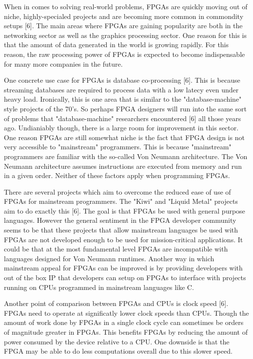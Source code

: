 \documentclass{article}
\begin{document}
    When in comes to solving real-world problems, FPGAs are quickly moving out of niche,
    highly-specialed projects and are becoming more common in commondity setups [6].
    The main areas where FPGAs are gaining popularity are both in the networking sector
    as well as the graphics processing sector. One reason for this is that the amount
    of data generated in the world is growing rapidly. For this reason, the raw processing
    power of FPGAs is expected to become indispensable for many more companies in the future.

    One concrete use case for FPGAs is database co-processing [6]. This is because
    streaming databases are required to process data with a low latecy even under heavy
    load. Ironically, this is one area that is similar to the "database-machine" style
    projects of the 70's. So perhaps FPGA designers will run into the same sort of
    problems that "database-machine" researchers encountered [6] all those years ago.
    Undianiably though, there is a large room for improvement in this sector.
    One reason FPGAs are still somewhat niche is the fact that FPGA design is not
    very accessible to "mainstream" programmers. This is because "mainstream" programmers
    are familiar with the so-called Von Neumann architecture. The Von Neumann architecture
    assumes instructions are executed from memory and run in a given order. Neither of these
    factors apply when programming FPGAs.

    There are several projects which aim to overcome the reduced ease of use of FPGAs
    for mainstream programmers. The "Kiwi" and "Liquid Metal" projects aim to do exactly
    this [6]. The goal is that FPGAs be used with general purpose languages.
    However the general sentiment in the FPGA developer community seems to be that these
    projects that allow mainstream languages be used with FPGAs are not developed
    enough to be used for mission-critical applications.
    It could be that at the most fundamental level FPGAs are incompatible with languages
    designed for Von Neumann runtimes.
    Another way in which mainstream appeal for FPGAs can be improved is by
    providing developers with out of the box IP that developers can setup on FPGAs to interface
    with projects running on CPUs programmed in mainstream languages like C.

    Another point of comparison between FPGAs and CPUs is clock speed [6]. FPGAs need to operate
    at significatly lower clock speeds than CPUs. Though the amount of work done by FPGAs
    in a single clock cycle can sometimes be orders of magnitude greater in FPGAs. This benefits
    FPGAs by reducing the amount of power consumed by the device relative to a CPU. One downside
    is that the FPGA may be able to do less computations overall due to this slower speed.
\end{document}
